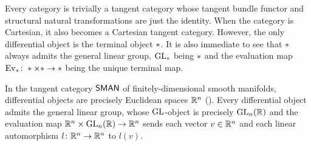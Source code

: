 \begin{example}
\label{example:GL-trivial}
Every category is trivially a tangent category whose tangent bundle functor and structural natural transformations are just the identity. When the category is Cartesian, it also becomes a Cartesian tangent category. However, the only differential object is the terminal object $\ast$. It is also immediate to see that $\ast$ always admits the general linear group, $\operatorname{GL}_\ast$ being $\ast$ and the evaluation map $\operatorname{Ev}_\ast\colon\ast\times\ast\to\ast$ being the unique terminal map.
\end{example}

\begin{example}
\label{example:GL-sman}
In the tangent category $\SMan$ of finitely-dimensional smooth manifolds, differential objects are precisely Euclidean spaces $\mathbb{\bm{R}}^n$ (\cite[Example~3.3(i)]{cockett:differential-bundles}). Every differential object admits the general linear group, whose $\operatorname{GL}$-object is precisely $\operatorname{GL}_n(\mathbb{\bm{R}})$ and the evaluation map $\mathbb{\bm{R}}^n\times\operatorname{GL}_n(\mathbb{\bm{R}})\to\mathbb{\bm{R}}^n$ sends each vector $v\in\mathbb{\bm{R}}^n$ and each linear automorphism $l\colon\mathbb{\bm{R}}^n\to\mathbb{\bm{R}}^n$ to $l(v)$.
\end{example}

